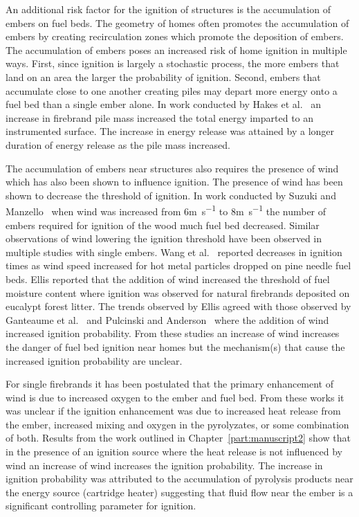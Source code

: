     An additional risk factor for the ignition of structures is the accumulation of embers on fuel beds. The geometry of homes often promotes the accumulation of embers by creating recirculation zones which promote the deposition of embers. The accumulation of embers poses an increased risk of home ignition in multiple ways. First, since ignition is largely a stochastic process, the more embers that land on an area the larger the probability of ignition. Second, embers that accumulate close to one another creating piles may depart more energy onto a fuel bed than a single ember alone. In work conducted by Hakes et al.~\cite{Hakes2019a} an increase in firebrand pile mass increased the total energy imparted to an instrumented surface. The increase in energy release was attained by a longer duration of energy release as the pile mass increased.
    
    The accumulation of embers near structures also requires the presence of wind which has also been shown to influence ignition. The presence of wind has been shown to decrease the threshold of ignition. In work conducted by Suzuki and Manzello~\cite{Suzuki2020a} when wind was increased from 6\si{\meter\per\second} to 8\si{\meter\per\second} the number of embers required for ignition of the wood much fuel bed decreased. Similar observations of wind lowering the ignition threshold have been observed in multiple studies with single embers. Wang et al.~\cite{Wang2017} reported decreases in ignition times as wind speed increased for hot metal particles dropped on pine needle fuel beds. Ellis reported that the addition of wind increased the threshold of fuel moisture content where ignition was observed for natural firebrands  deposited on eucalypt forest litter. The trends observed by Ellis agreed with those observed by Ganteaume et al.~\cite{Ganteaume2009} and Pulcinski and Anderson~\cite{Plucinski2008} where the addition of wind increased ignition probability. From these studies an increase of wind increases the danger of fuel bed ignition near homes but the mechanism(s) that cause the increased ignition probability are unclear. 
    
    For single firebrands it has been postulated that the primary enhancement of wind is due to increased oxygen to the ember and fuel bed. From these works it was unclear if the ignition enhancement was due to increased heat release from the ember, increased mixing and oxygen in the pyrolyzates, or some combination of both. Results from the work outlined in Chapter~\ref{part:manuscript2} show that in the presence of an ignition source where the heat release is not influenced by wind an increase of wind increases the ignition probability. The increase in ignition probability was attributed to the accumulation of pyrolysis products near the energy source (cartridge heater) suggesting that fluid flow near the ember is a significant controlling parameter for ignition. 
    

